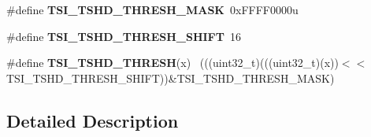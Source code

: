 \begin{DoxyCompactItemize}
\item 
\hypertarget{group___t_s_i___register___masks_ga0600b952fc2faf25682e507b91ce4a15}{}\#define {\bfseries T\+S\+I\+\_\+\+T\+S\+H\+D\+\_\+\+T\+H\+R\+E\+S\+H\+\_\+\+M\+A\+S\+K}~0x\+F\+F\+F\+F0000u\label{group___t_s_i___register___masks_ga0600b952fc2faf25682e507b91ce4a15}

\item 
\hypertarget{group___t_s_i___register___masks_gaf35f3c8f797b62c3b5dba24c5035255a}{}\#define {\bfseries T\+S\+I\+\_\+\+T\+S\+H\+D\+\_\+\+T\+H\+R\+E\+S\+H\+\_\+\+S\+H\+I\+F\+T}~16\label{group___t_s_i___register___masks_gaf35f3c8f797b62c3b5dba24c5035255a}

\item 
\hypertarget{group___t_s_i___register___masks_ga7ded0a15f05cf765819fe323be035305}{}\#define {\bfseries T\+S\+I\+\_\+\+T\+S\+H\+D\+\_\+\+T\+H\+R\+E\+S\+H}(x)                                          ~(((uint32\+\_\+t)(((uint32\+\_\+t)(x))$<$$<$T\+S\+I\+\_\+\+T\+S\+H\+D\+\_\+\+T\+H\+R\+E\+S\+H\+\_\+\+S\+H\+I\+F\+T))\&T\+S\+I\+\_\+\+T\+S\+H\+D\+\_\+\+T\+H\+R\+E\+S\+H\+\_\+\+M\+A\+S\+K)\label{group___t_s_i___register___masks_ga7ded0a15f05cf765819fe323be035305}

\end{DoxyCompactItemize}


\subsection{Detailed Description}
